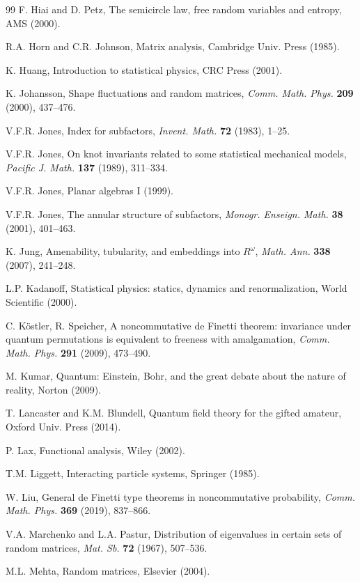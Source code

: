 \documentclass[12pt]{amsbook}
\begin{document}
\begin{thebibliography}{99}
F. Hiai and D. Petz, The semicircle law, free random variables and entropy, AMS (2000).

R.A. Horn and C.R. Johnson, Matrix analysis, Cambridge Univ. Press (1985).

K. Huang, Introduction to statistical physics, CRC Press (2001).

K. Johansson, Shape fluctuations and random matrices, {\em Comm.  Math. Phys.} {\bf 209} (2000), 437--476.

V.F.R. Jones, Index for subfactors, {\em Invent. Math.} {\bf 72} (1983), 1--25.

V.F.R. Jones, On knot invariants related to some statistical mechanical models, {\em Pacific J. Math.} {\bf 137} (1989), 311--334.

V.F.R. Jones, Planar algebras I (1999).

V.F.R. Jones, The annular structure of subfactors, {\em Monogr. Enseign. Math.} {\bf 38} (2001), 401--463.

K. Jung, Amenability, tubularity, and embeddings into $R^\omega$, {\em Math. Ann.} {\bf 338} (2007), 241--248.

L.P. Kadanoff, Statistical physics: statics, dynamics and renormalization, World Scientific (2000).

C. K\"ostler, R. Speicher, A noncommutative de Finetti theorem: invariance under quantum permutations is equivalent to freeness with amalgamation, {\em Comm. Math. Phys.} {\bf 291} (2009), 473--490.

M. Kumar, Quantum: Einstein, Bohr, and the great debate about the nature of reality, Norton (2009). 

T. Lancaster and K.M. Blundell, Quantum field theory for the gifted amateur, Oxford Univ. Press (2014).

P. Lax, Functional analysis, Wiley (2002).

T.M. Liggett, Interacting particle systems, Springer (1985).

W. Liu, General de Finetti type theorems in noncommutative probability, {\em  Comm. Math. Phys.} {\bf 369} (2019), 837--866.

V.A. Marchenko and L.A. Pastur, Distribution of eigenvalues in certain sets of random matrices, {\em Mat. Sb.} {\bf 72} (1967), 507--536.

M.L. Mehta, Random matrices, Elsevier (2004).


\end{thebibliography}
\end{document}

